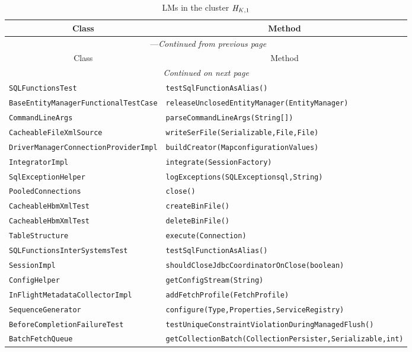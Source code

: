 \begin{center}
\begin{longtable}{ll}
\caption{LMs in the cluster $\mathit{H}_{\mathit{K},1}$}\\
\toprule\multicolumn{1}{c}{Class}&\multicolumn{1}{c}{Method}\\\midrule
\endfirsthead

\multicolumn{2}{c}{\tablename\ \thetable{}---\textit{Continued from previous page}} \\\midrule
\multicolumn{1}{c}{Class}&\multicolumn{1}{c}{Method}\\\midrule
\endhead
\multicolumn{2}{c}{\textit{Continued on next page}}\\\midrule
\endfoot
\bottomrule
\endlastfoot
\lstinline/SQLFunctionsTest/&{\lstinline/testSqlFunctionAsAlias()/}\\
\lstinline/BaseEntityManagerFunctionalTestCase/&{\lstinline/releaseUnclosedEntityManager(EntityManager)/}\\
\lstinline/CommandLineArgs/&{\lstinline/parseCommandLineArgs(String[])/}\\
\lstinline/CacheableFileXmlSource/&{\lstinline/writeSerFile(Serializable,File,File)/}\\
\lstinline/DriverManagerConnectionProviderImpl/&{\lstinline/buildCreator(MapconfigurationValues)/}\\
\lstinline/IntegratorImpl/&{\lstinline/integrate(SessionFactory)/}\\
\lstinline/SqlExceptionHelper/&{\lstinline/logExceptions(SQLExceptionsql,String)/}\\
\lstinline/PooledConnections/&{\lstinline/close()/}\\
\lstinline/CacheableHbmXmlTest/&{\lstinline/createBinFile()/}\\
\lstinline/CacheableHbmXmlTest/&{\lstinline/deleteBinFile()/}\\
\lstinline/TableStructure/&{\lstinline/execute(Connection)/}\\
\lstinline/SQLFunctionsInterSystemsTest/&{\lstinline/testSqlFunctionAsAlias()/}\\
\lstinline/SessionImpl/&{\lstinline/shouldCloseJdbcCoordinatorOnClose(boolean)/}\\
\lstinline/ConfigHelper/&{\lstinline/getConfigStream(String)/}\\
\lstinline/InFlightMetadataCollectorImpl/&{\lstinline/addFetchProfile(FetchProfile)/}\\
\lstinline/SequenceGenerator/&{\lstinline/configure(Type,Properties,ServiceRegistry)/}\\
\lstinline/BeforeCompletionFailureTest/&{\lstinline/testUniqueConstraintViolationDuringManagedFlush()/}\\
\lstinline/BatchFetchQueue/&{\lstinline/getCollectionBatch(CollectionPersister,Serializable,int)/}\\
\end{longtable}
\end{center}

